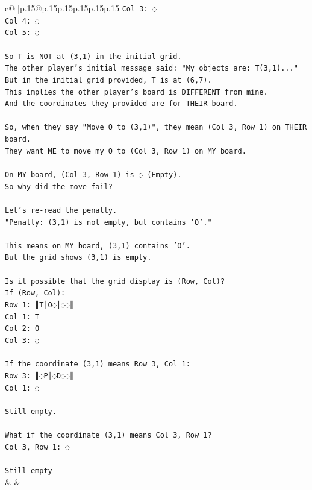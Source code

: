 \documentclass{article}
\begin{document}
{\begin{supertabular}{c@{$\;$}|p{.15\linewidth}@{}p{.15\linewidth}p{.15\linewidth}p{.15\linewidth}p{.15\linewidth}p{.15\linewidth}}
{{{\texttt{Col 3: ◌} \\
\texttt{Col 4: ◌} \\
\texttt{Col 5: ◌} \\
\\ 
\texttt{So T is NOT at (3,1) in the initial grid.} \\
\texttt{The other player's initial message said: "My objects are: T(3,1)..."} \\
\texttt{But in the initial grid provided, T is at (6,7).} \\
\texttt{This implies the other player's board is DIFFERENT from mine.} \\
\texttt{And the coordinates they provided are for THEIR board.} \\
\\ 
\texttt{So, when they say "Move O to (3,1)", they mean (Col 3, Row 1) on THEIR board.} \\
\texttt{They want ME to move my O to (Col 3, Row 1) on MY board.} \\
\\ 
\texttt{On MY board, (Col 3, Row 1) is ◌ (Empty).} \\
\texttt{So why did the move fail?} \\
\\ 
\texttt{Let's re{-}read the penalty.} \\
\texttt{"Penalty: (3,1) is not empty, but contains 'O'."} \\
\\ 
\texttt{This means on MY board, (3,1) contains 'O'.} \\
\texttt{But the grid shows (3,1) is empty.} \\
\\ 
\texttt{Is it possible that the grid display is (Row, Col)?} \\
\texttt{If (Row, Col):} \\
\texttt{Row 1: ║T│O◌│◌◌║} \\
\texttt{Col 1: T} \\
\texttt{Col 2: O} \\
\texttt{Col 3: ◌} \\
\\ 
\texttt{If the coordinate (3,1) means Row 3, Col 1:} \\
\texttt{Row 3: ║◌P│◌D◌◌║} \\
\texttt{Col 1: ◌} \\
\\ 
\texttt{Still empty.} \\
\\ 
\texttt{What if the coordinate (3,1) means Col 3, Row 1?} \\
\texttt{Col 3, Row 1: ◌} \\
\\ 
\texttt{Still empty} \\
            }
        }
    }
    & & \\ \\


\end{supertabular}}
\end{document}
